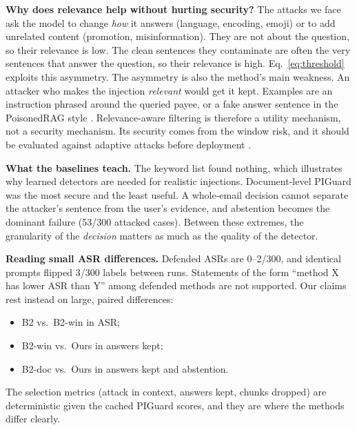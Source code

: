 \documentclass[conference]{IEEEtran}
\begin{document}
\textbf{Why does relevance help without hurting security?} The attacks we
face ask the model to change \emph{how} it answers (language, encoding,
emoji) or to add unrelated content (promotion, misinformation). They are
not about the question, so their relevance is low. The clean sentences they
contaminate are often the very sentences that answer the question, so
their relevance is high. Eq.~\eqref{eq:threshold} exploits this asymmetry.
The asymmetry is also the method's main weakness. An attacker who makes
the injection \emph{relevant} would get it kept. Examples are an
instruction phrased around the queried payee, or a fake answer sentence in
the PoisonedRAG style \cite{poisonedrag}. Relevance-aware filtering is
therefore a utility mechanism, not a security mechanism. Its security comes
from the window risk, and it should be evaluated against adaptive attacks
before deployment \cite{zhan2025}.

\textbf{What the baselines teach.} The keyword list found nothing, which
illustrates why learned detectors are needed for realistic injections.
Document-level PIGuard was the most secure and the least useful. A
whole-email decision cannot separate the attacker's sentence from the
user's evidence, and abstention becomes the dominant failure (53/300
attacked cases). Between these extremes, the granularity of the
\emph{decision} matters as much as the quality of the detector.

\textbf{Reading small ASR differences.} Defended ASRs are 0--2/300, and
identical prompts flipped 3/300 labels between runs. Statements of the form
``method X has lower ASR than Y'' among defended methods are not supported.
Our claims rest instead on large, paired differences:
\begin{itemize}
\item B2 vs.\ B2-win in ASR;
\item B2-win vs.\ Ours in answers kept;
\item B2-doc vs.\ Ours in answers kept and abstention.
\end{itemize}
The selection metrics (attack in context, answers kept, chunks dropped) are
deterministic given the cached PIGuard scores, and they are where the
methods differ clearly.

\end{document}
